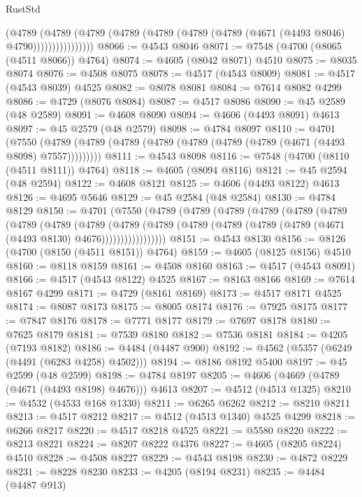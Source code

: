 \begin{lexlean}{RustStd}
\begin{coremodule}
                    (@4789
                      (@4789
                        (@4789
                          (@4789 (@4789 (@4789 (@4789 (@4671 (@4493 @8046) @4790))))))))))))))))
@8066 := @4543 @8046
@8071 := @7548 (@4700 (@8065 (@4511 @8066)) @4764)
@8074 := @4605 (@8042 @8071) @4510
@8075 := @8035 @8074
@8076 := @4508 @8075
@8078 := @4517 (@4543 @8009)
@8081 := @4517 (@4543 @8039) @4525
@8082 := @8078 @8081
@8084 := @7614 @8082 @4299
@8086 := @4729 (@8076 @8084)
@8087 := @4517 @8086
@8090 := @45 @2589 (@48 @2589)
@8091 := @4608 @8090
@8094 := @4606 (@4493 @8091) @4613
@8097 := @45 @2579 (@48 @2579)
@8098 := @4784 @8097
@8110 := @4701
    (@7550 (@4789 (@4789 (@4789 (@4789 (@4789 (@4789 (@4789 (@4671 (@4493 @8098) @7557)))))))))
@8111 := @4543 @8098
@8116 := @7548 (@4700 (@8110 (@4511 @8111)) @4764)
@8118 := @4605 (@8094 @8116)
@8121 := @45 @2594 (@48 @2594)
@8122 := @4608 @8121
@8125 := @4606 (@4493 @8122) @4613
@8126 := @4695 @5646
@8129 := @45 @2584 (@48 @2584)
@8130 := @4784 @8129
@8150 := @4701
    (@7550
      (@4789
        (@4789
          (@4789
            (@4789
              (@4789
                (@4789
                  (@4789
                    (@4789
                      (@4789
                        (@4789
                          (@4789
                            (@4789 (@4789 (@4789 (@4789 (@4671 (@4493 @8130) @4676)))))))))))))))))
@8151 := @4543 @8130
@8156 := @8126 (@4700 (@8150 (@4511 @8151)) @4764)
@8159 := @4605 (@8125 @8156) @4510
@8160 := @8118 @8159
@8161 := @4508 @8160
@8163 := @4517 (@4543 @8091)
@8166 := @4517 (@4543 @8122) @4525
@8167 := @8163 @8166
@8169 := @7614 @8167 @4299
@8171 := @4729 (@8161 @8169)
@8173 := @4517 @8171 @4525
@8174 := @8087 @8173
@8175 := @8005 @8174
@8176 := @7925 @8175
@8177 := @7847 @8176
@8178 := @7771 @8177
@8179 := @7697 @8178
@8180 := @7625 @8179
@8181 := @7539 @8180
@8182 := @7536 @8181
@8184 := @4205 (@7193 @8182)
@8186 := @4484 (@4487 @900)
@8192 := @4562 (@5357 (@6249 (@4491 (@6283 @4258) @4502)))
@8194 := @8186 @8192 @5400
@8197 := @45 @2599 (@48 @2599)
@8198 := @4784 @8197
@8205 := @4606 (@4669 (@4789 (@4671 (@4493 @8198) @4676))) @4613
@8207 := @4512 (@4513 @1325)
@8210 := @4532 (@4533 @168 @1330)
@8211 := @6265 @6262
@8212 := @8210 @8211
@8213 := @4517 @8212
@8217 := @4512 (@4513 @1340) @4525 @4299
@8218 := @6266 @8217
@8220 := @4517 @8218 @4525
@8221 := @5580 @8220
@8222 := @8213 @8221
@8224 := @8207 @8222 @4376
@8227 := @4605 (@8205 @8224) @4510
@8228 := @4508 @8227
@8229 := @4543 @8198
@8230 := @4872 @8229
@8231 := @8228 @8230
@8233 := @4205 (@8194 @8231)
@8235 := @4484 (@4487 @913)

\end{coremodule}
\end{lexlean}
